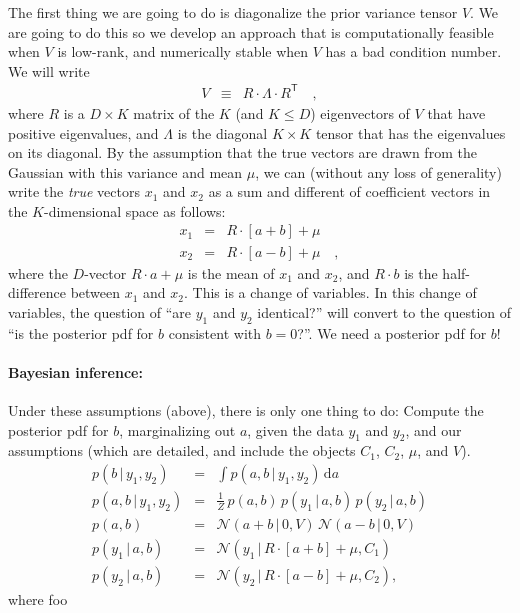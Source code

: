\documentclass[12pt,letterpaper]{article}
\newcommand{\transpose}[1]{{#1}^{\mathsf{T}}}
\newcommand{\given}{\,|\,}
\newcommand{\dd}{\mathrm{d}}
\newcommand{\normal}{\mathcal{N}}
\begin{document}
The first thing we are going to do is diagonalize the prior variance
tensor $V$. We are going to do this so we develop an approach that is
computationally feasible when $V$ is low-rank, and numerically stable
when $V$ has a bad condition number. We will write
\begin{eqnarray}
V &\equiv& R\cdot\Lambda\cdot\transpose{R} \quad ,
\end{eqnarray}
where $R$ is a $D\times K$ matrix of the $K$ (and $K\leq D$)
eigenvectors of $V$ that have positive eigenvalues, and $\Lambda$ is
the diagonal $K\times K$ tensor that has the eigenvalues on its
diagonal. By the assumption that the true vectors are drawn from the
Gaussian with this variance and mean $\mu$, we can (without any loss
of generality) write the \emph{true} vectors $x_1$ and $x_2$ as a sum
and different of coefficient vectors in the $K$-dimensional space as
follows:
\begin{eqnarray}
x_1 &=& R\cdot[a + b] + \mu \\
x_2 &=& R\cdot[a - b] + \mu \quad ,
\end{eqnarray}
where the $D$-vector $R\cdot a + \mu$ is the mean of $x_1$ and $x_2$,
and $R\cdot b$ is the half-difference between $x_1$ and $x_2$. This is
a change of variables.  In this change of variables, the question of
``are $y_1$ and $y_2$ identical?'' will convert to the question of
``is the posterior pdf for $b$ consistent with $b=0$?''. We need a
posterior pdf for $b$!

\paragraph{Bayesian inference:}
Under these assumptions (above), there is only one thing to do:
Compute the posterior pdf for $b$, marginalizing out $a$, given the
data $y_1$ and $y_2$, and our assumptions (which are detailed, and
include the objects $C_1$, $C_2$, $\mu$, and $V$).
\begin{eqnarray}
p(b\given y_1,y_2) &=& \int p(a,b\given y_1,y_2)\,\dd a \\
p(a,b\given y_1,y_2) &=& \frac{1}{Z}\,p(a,b)\,p(y_1\given a,b)\,p(y_2\given a,b) \\
p(a,b) &=& \normal(a+b\given 0,V)\,\normal(a-b\given 0,V) \\
p(y_1\given a,b) &=& \normal(y_1\given R\cdot[a+b]+\mu,C_1) \\
p(y_2\given a,b) &=& \normal(y_2\given R\cdot[a-b]+\mu,C_2), \quad
\end{eqnarray}
where foo
\end{document}
